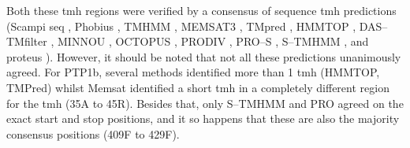 Both these \gls{tmh} regions were verified by a consensus of sequence \gls{tmh} predictions (Scampi seq \cite{Bernsel2008}, Phobius \cite{Kall2004}, TMHMM \cite{Krogh2001}, MEMSAT3 \cite{Jones2007}, TMpred \cite{Hofmann1993}, HMMTOP \cite{Tusnady2001},
DAS--TMfilter \cite{Cserzo2004}, MINNOU \cite{Cao2006}, OCTOPUS \cite{Viklund2008}, PRODIV \cite{Viklund2004}, PRO--S \cite{Viklund2004}, S--TMHMM \cite{Viklund2004}, and proteus \cite{Montgomerie2008}).
However, it should be noted that not all these predictions unanimously agreed.
For PTP1b, several methods identified more than 1 \gls{tmh} (HMMTOP, TMPred) whilst Memsat identified a short \gls{tmh} in a completely different region for the \gls{tmh} (35A to 45R).
Besides that, only S--TMHMM and PRO agreed on the exact start and stop positions, and it so happens that these are also the majority consensus positions \cite{Kurowski2003} (409F to 429F).





